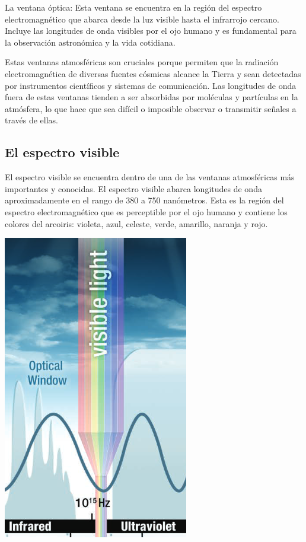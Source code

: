 \documentclass[a4paper,12pt]{article}
\newenvironment{Figure}
  {\par\medskip\noindent\minipage{\linewidth}}
  {\endminipage\par\medskip}
\begin{document}
\begin{multicols*}{2}
\newpage

La ventana óptica: Esta ventana se encuentra en la región del espectro electromagnético que abarca desde la luz visible hasta el infrarrojo cercano. Incluye las longitudes de onda visibles por el ojo humano y es fundamental para la observación astronómica y la vida cotidiana.

Estas ventanas atmosféricas son cruciales porque permiten que la radiación electromagnética de diversas fuentes cósmicas alcance la Tierra y sean detectadas por instrumentos científicos y sistemas de comunicación. Las longitudes de onda fuera de estas ventanas tienden a ser absorbidas por moléculas y partículas en la atmósfera, lo que hace que sea difícil o imposible observar o transmitir señales a través de ellas.

\subsection*{El espectro visible}

El espectro visible se encuentra dentro de una de las ventanas atmosféricas más importantes y conocidas. El espectro visible abarca longitudes de onda aproximadamente en el rango de 380 a 750 nanómetros. Esta es la región del espectro electromagnético que es perceptible por el ojo humano y contiene los colores del arcoiris: violeta, azul, celeste, verde, amarillo, naranja y rojo.

\begin{Figure}
    \centering
    \includegraphics[width=0.5\linewidth]{EspectroVisible.png}
    \label{fig: especVisible}
\end{Figure}


\end{multicols*}
\end{document}
